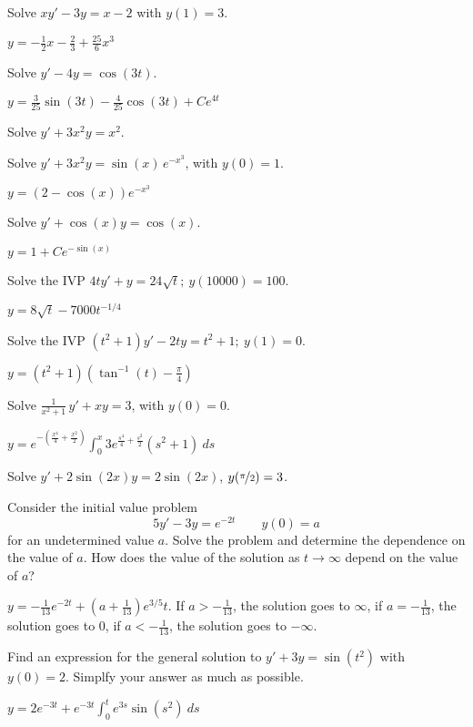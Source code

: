 \begin{exercise}
Solve $xy' - 3y = x-2$ with $y(1) = 3$. 
\end{exercise}
\comboSol{%
}
{%
$y = -\frac{1}{2}x - \frac{2}{3} + \frac{25}{6}x^3$
}

\begin{exercise}
Solve $y' - 4y = \cos{(3t)}$.
\end{exercise}
\comboSol{%
}
{%
$y = \frac{3}{25}\sin(3t) - \frac{4}{25}\cos(3t) + Ce^{4t}$
}

\begin{exercise}\ansMark%
Solve $y'+3 x^2 y = x^2$.
\end{exercise}

\begin{exercise}
Solve $y' + 3x^2y = \sin(x) \, e^{-x^3}$, with $y(0) = 1$.
\end{exercise}
\comboSol{%
}
{%
$y = (2-\cos(x))e^{-x^3}$
}

\begin{exercise}
Solve $y' + \cos (x) y = \cos(x)$.
\end{exercise}
\comboSol{%
}
{%
$y = 1 + Ce^{-\sin(x)}$
}

\begin{exercise}
Solve the IVP $4ty'+y=24\sqrt{t};\ y(10000)=100.$ %
\end{exercise}
\comboSol{%
}
{%
$y = 8\sqrt{t} - 7000t^{-1/4}$
}

\begin{exercise}
Solve the IVP $(t^2+1)y' - 2ty = t^2+1; \ y(1)=0$. %
\end{exercise}
\comboSol{%
}
{%
$y = (t^2 + 1)\left(\tan^{-1}(t) - \frac{\pi}{4}\right)$
}

\begin{exercise}
Solve $\frac{1}{x^2+1} \, y' + x y = 3$, with $y(0) = 0$.
\end{exercise}
\comboSol{%
}
{%
$y = e^{-\left(\frac{x^4}{4} + \frac{x^2}{2}\right)}\int_0^x 3e^{\frac{s^4}{4} + \frac{s^2}{2}}(s^2 + 1)\ ds$
}

\begin{exercise}\ansMark%
Solve $y'+ 2\sin(2x) y = 2\sin(2x)$, $y(\nicefrac{\pi}{2}) = 3$.
\end{exercise}

\begin{exercise}
Consider the initial value problem
\[ 5y' - 3y = e^{-2t} \qquad y(0) = a \] for an undetermined value $a$. Solve the problem and determine the dependence on the value of $a$. How does the value of the solution as $t \rightarrow \infty$ depend on the value of $a$?
\end{exercise}
\comboSol{%
}
{%
$y = -\frac{1}{13}e^{-2t} + \left(a + \frac{1}{13}\right)e^{3/5}t$. If $a > -\frac{1}{13}$, the solution goes to $\infty$, if $a = -\frac{1}{13}$, the solution goes to 0, if $a < -\frac{1}{13}$, the solution goes to $-\infty$.
}

\begin{exercise}
Find an expression for the general solution to $y' + 3y = \sin(t^2)$ with $y(0) = 2$. Simplfy your answer as much as possible. 
\end{exercise}
\comboSol{%
}
{%
$y = 2e^{-3t} + e^{-3t}\int_0^t e^{3s}\sin(s^2)\ ds$
}

\setcounter{exercise}{100}





